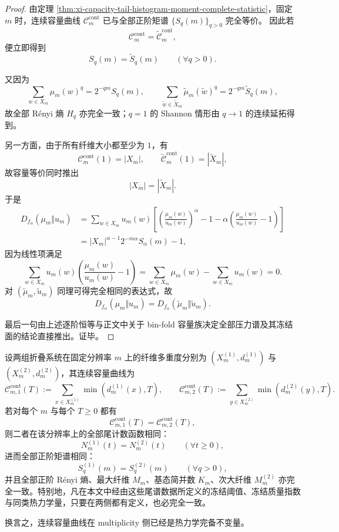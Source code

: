 \begin{proof}
由定理 \ref{thm:xi-capacity-tail-histogram-moment-complete-statistic}，固定 \(m\) 时，连续容量曲线 \(\mathcal C_m^{\mathrm{cont}}\) 已与全部正阶矩谱 \(\{S_q(m)\}_{q>0}\) 完全等价。
因此若
\[
\mathcal C_m^{\mathrm{cont}}=\widetilde{\mathcal C}_m^{\mathrm{cont}},
\]
便立即得到
\[
S_q(m)=\widetilde S_q(m)
\qquad(\forall q>0).
\]

又因为
\[
\sum_{w\in X_m}\mu_m(w)^q
=
2^{-qm}S_q(m),
\qquad
\sum_{\widetilde w\in \widetilde X_m}\widetilde\mu_m(\widetilde w)^q
=
2^{-qm}\widetilde S_q(m),
\]
故全部 Rényi 熵 \(H_q\) 亦完全一致；\(q=1\) 的 Shannon 情形由 \(q\to 1\) 的连续延拓得到。

另一方面，由于所有纤维大小都至少为 \(1\)，有
\[
\mathcal C_m^{\mathrm{cont}}(1)=|X_m|,
\qquad
\widetilde{\mathcal C}_m^{\mathrm{cont}}(1)=|\widetilde X_m|,
\]
故容量等价同时推出
\[
|X_m|=|\widetilde X_m|.
\]
于是
\[
\begin{aligned}
D_{f_\alpha}(\mu_m\Vert u_m)
&=
\sum_{w\in X_m}
u_m(w)\left[
\left(\frac{\mu_m(w)}{u_m(w)}\right)^\alpha
-1-\alpha\left(\frac{\mu_m(w)}{u_m(w)}-1\right)
\right]\\
&=
|X_m|^{\alpha-1}2^{-m\alpha}S_\alpha(m)-1,
\end{aligned}
\]
因为线性项满足
\[
\sum_{w\in X_m}u_m(w)\left(\frac{\mu_m(w)}{u_m(w)}-1\right)
=
\sum_{w\in X_m}\mu_m(w)-\sum_{w\in X_m}u_m(w)=0.
\]
对 \((\widetilde\mu_m,\widetilde u_m)\) 同理可得完全相同的表达式，故
\[
D_{f_\alpha}(\mu_m\Vert u_m)
=
D_{f_\alpha}(\widetilde\mu_m\Vert \widetilde u_m).
\]

最后一句由上述逐阶恒等与正文中关于 bin-fold 容量族决定全部压力谱及其冻结面的结论直接推出。证毕。
\end{proof}

\begin{theorem}\label{thm:conclusion-continuous-capacity-curve-thermodynamic-completeness}
设两组折叠系统在固定分辨率 \(m\) 上的纤维多重度分别为 \((X_m^{(1)},d_m^{(1)})\) 与 \((X_m^{(2)},d_m^{(2)})\)，其连续容量曲线为
\[
\mathcal C_{m,1}^{\mathrm{cont}}(T)
:=
\sum_{x\in X_m^{(1)}}\min(d_m^{(1)}(x),T),
\qquad
\mathcal C_{m,2}^{\mathrm{cont}}(T)
:=
\sum_{y\in X_m^{(2)}}\min(d_m^{(2)}(y),T).
\]
若对每个 \(m\) 与每个 \(T\ge 0\) 都有
\[
\mathcal C_{m,1}^{\mathrm{cont}}(T)=\mathcal C_{m,2}^{\mathrm{cont}}(T),
\]
则二者在该分辨率上的全部尾计数函数相同：
\[
N_m^{(1)}(t)=N_m^{(2)}(t)
\qquad (\forall t\ge 0),
\]
进而全部正阶矩谱相同：
\[
S_q^{(1)}(m)=S_q^{(2)}(m)
\qquad (\forall q>0),
\]
并且全部正阶 Rényi 熵、最大纤维 \(M_m\)、基态简并数 \(K_m\)、次大纤维 \(M_m^{(2)}\) 亦完全一致。特别地，凡在本文中经由这些尾谱数据所定义的冻结阈值、冻结质量指数与同类热力学量，只要在两侧都有定义，也必完全一致。

换言之，连续容量曲线在 multiplicity 侧已经是热力学完备不变量。
\end{theorem}

